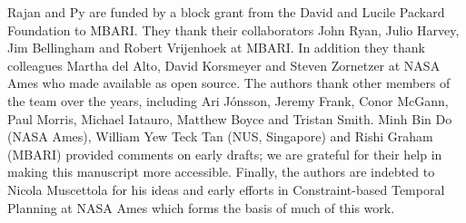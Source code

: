 \documentclass[graybox,14pt]{svmult}
\begin{document}
Rajan and Py are funded by a block grant from the David and Lucile
Packard Foundation to MBARI. They thank their collaborators John Ryan,
Julio Harvey, Jim Bellingham and Robert Vrijenhoek at MBARI. In
addition they thank colleagues Martha del Alto, David Korsmeyer and
Steven Zornetzer at NASA Ames who made \eu available as open
source. The authors thank other members of the \eu team over the
years, including Ari J\'onsson, Jeremy Frank, Conor McGann, Paul
Morris, Michael Iatauro, Matthew Boyce and Tristan Smith.  Minh Bin Do
(NASA Ames), William Yew Teck Tan (NUS, Singapore) and Rishi Graham
(MBARI) provided comments on early drafts; we are grateful for their
help in making this manuscript more accessible. Finally, the authors
are indebted to Nicola Muscettola for his ideas and early efforts in
Constraint-based Temporal Planning at NASA Ames which forms the basis
of much of this work.



\end{document}
